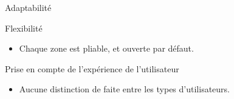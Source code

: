 \begin{frame}{Adaptabilité}

  \begin{block}{Flexibilité}
    \begin{itemize}
    \item<pro@1-> Chaque zone est pliable, et ouverte par défaut.
    \end{itemize}
  \end{block}

  \begin{block}{Prise en compte de l'expérience de l'utilisateur}
    \begin{itemize}
    \item Aucune distinction de faite entre les types d'utilisateurs.
    \end{itemize}

  \end{block}

\end{frame}
